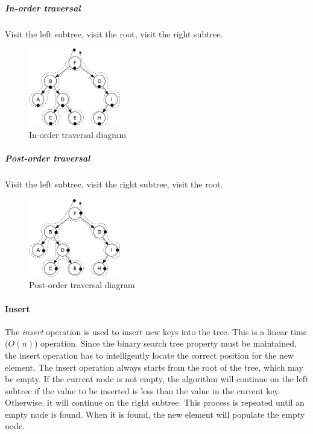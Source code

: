 \documentclass{article}
\begin{document}
{\begin{samepage}
  \subparagraph{In-order traversal}
  Visit the left subtree, visit the root, visit the right subtree.

  \begin{figure}[H]
    \centering
    \includegraphics[width=4cm]{in_order_traversal}
    \caption{In-order traversal diagram}
  \end{figure}

  \subparagraph{Post-order traversal}
  Visit the left subtree, visit the right subtree, visit the root.

  \begin{figure}[H]
    \centering
    \includegraphics[width=4cm]{post_order_traversal}
    \caption{Post-order traversal diagram}
  \end{figure}
\end{samepage}




\paragraph{Insert}
The {\em insert} operation is used to insert new keys into the tree. This is a linear time (\(O(n)\)) operation.
Since the binary search tree property must be maintained, the insert operation has to intelligently locate the
correct position for the new element. The insert operation always starts from the root of the tree,
which may be empty. If the current node is not empty, the algorithm will continue on the left subtree if
the value to be inserted is less than the value in the current key. Otherwise, it will continue on the right
subtree. This process is repeated until an empty node is found. When it is found, the new element will populate
the empty node.

}
\end{document}
